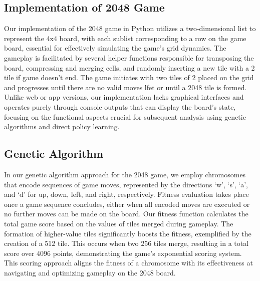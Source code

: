 \documentclass[11pt]{article}
\begin{document}



\subsection{Implementation of 2048 Game}

Our implementation of the 2048 game in Python utilizes a two-dimensional list to represent the 4x4 board, with each sublist corresponding to a row on the game board, essential for effectively simulating the game's grid dynamics. The gameplay is facilitated by several helper functions responsible for transposing the board, compressing and merging cells, and randomly inserting a new tile with a 2 tile if game doesn't end. The game initiates with two tiles of 2 placed on the grid and progresses until there are no valid moves lfet or until a 2048 tile is formed. Unlike web or app versions, our implementation lacks graphical interfaces and operates purely through console outputs that can display the board's state, focusing on the functional aspects crucial for subsequent analysis using genetic algorithms and direct policy learning.

\subsection{Genetic Algorithm}
In our genetic algorithm approach for the 2048 game, we employ chromosomes that encode sequences of game moves, represented by the directions ‘w’, ‘s’, ‘a’, and ‘d’ for up, down, left, and right, respectively. Fitness evaluation takes place once a game sequence concludes, either when all encoded moves are executed or no further moves can be made on the board. Our fitness function calculates the total game score based on the values of tiles merged during gameplay. The formation of higher-value tiles significantly boosts the fitness, exemplified by the creation of a 512 tile. This occurs when two 256 tiles merge, resulting in a total score over 4096 points, demonstrating the game's exponential scoring system. This scoring approach aligns the fitness of a chromosome with its effectiveness at navigating and optimizing gameplay on the 2048 board.
\end{document}
